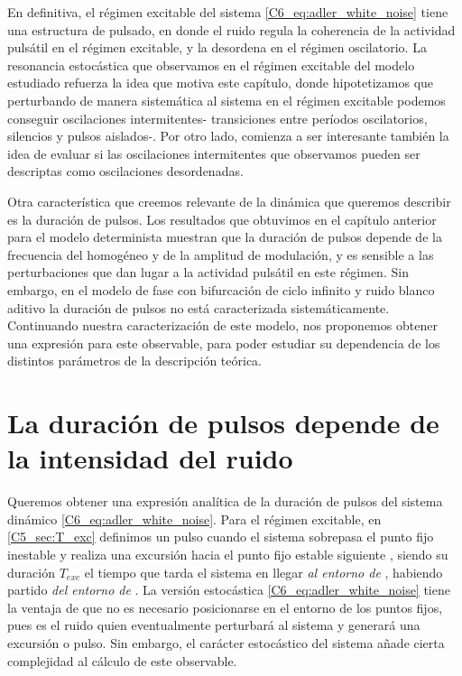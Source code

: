 \documentclass[./main.tex]{subfiles}
\begin{document}
En definitiva, el régimen excitable del sistema \ref{C6_eq:adler_white_noise} tiene una estructura de pulsado, en donde el ruido regula la coherencia de la actividad pulsátil en el régimen excitable, y la desordena en el régimen oscilatorio. La resonancia estocástica que observamos en el régimen excitable del modelo estudiado refuerza la idea que motiva este capítulo, donde hipotetizamos que perturbando de manera sistemática al sistema en el régimen excitable podemos conseguir oscilaciones intermitentes- transiciones entre períodos oscilatorios, silencios y pulsos aislados-. Por otro lado, comienza a ser interesante también la idea de evaluar si las oscilaciones intermitentes que observamos pueden ser descriptas como oscilaciones desordenadas. 


Otra característica que creemos relevante de la dinámica que queremos describir es la duración de pulsos. Los resultados que obtuvimos en el capítulo anterior para el modelo determinista muestran que la duración de pulsos depende de la frecuencia del homogéneo y de la amplitud de modulación, y es sensible a las perturbaciones que dan lugar a la actividad pulsátil en este régimen. Sin embargo, en el modelo de fase con bifurcación de ciclo infinito y ruido blanco aditivo la duración de pulsos no está caracterizada sistemáticamente. Continuando nuestra caracterización de este modelo, nos proponemos obtener una expresión para este observable, para poder estudiar su dependencia de los distintos parámetros de la descripción teórica.


\section{La duración de pulsos depende de la intensidad del ruido}
\label{C6_sec:duracion}


Queremos obtener una expresión analítica de la duración de pulsos del sistema dinámico \ref{C6_eq:adler_white_noise}. Para el régimen excitable, en \ref{C5_sec:T_exc} definimos un pulso cuando el sistema sobrepasa el punto fijo inestable \xxi y realiza una excursión hacia el punto fijo estable siguiente \xxe, siendo su duración $T_{exc}$ el tiempo que tarda el sistema en llegar \emph{al entorno de} \xxe, habiendo partido \emph{del entorno de} \xxi. La versión estocástica \ref{C6_eq:adler_white_noise} tiene la ventaja de que no es necesario posicionarse en el entorno de los puntos fijos, pues es el ruido quien eventualmente perturbará al sistema y generará una excursión o pulso. Sin embargo, el carácter estocástico del sistema añade cierta complejidad al cálculo de este observable.
\end{document}
